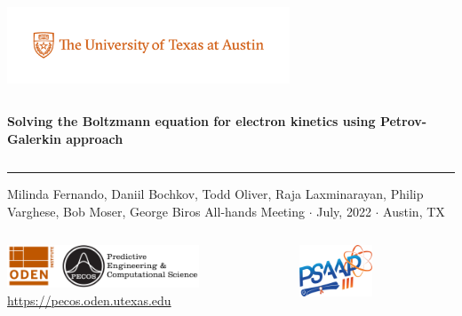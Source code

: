 \documentclass[mathserif, aspectratio=169]{beamer}
\begin{document}


%
\begin{frame}[plain,t]{}
\makeatletter
\includegraphics[height=0.9in,trim=50 40 40 0, clip]{PMSc_159_university_formal_horizontal.pdf} \newline
\begin{columns}[T,onlytextwidth]
{\bf \color{burntorange} \selectfont 
Solving the Boltzmann equation for electron kinetics using Petrov-Galerkin approach
}
\end{columns}
\vspace*{.15cm}
\rule{.8\textwidth}{0.6pt} \newline

\vspace*{0.05cm}
{\selectfont
  { \scriptsize
    Milinda Fernando, Daniil Bochkov, Todd Oliver, Raja Laxminarayan, Philip Varghese, Bob Moser, George Biros\newline
  }
  {\color{burntorange} \tiny
    All-hands Meeting $\cdot$ July, 2022 $\cdot$ Austin, TX
  }
}

\vspace*{1cm}
\begin{columns}
\begin{column}{0.8\linewidth}
\includegraphics[height=0.5in]{oden_pecos_2020_wordmark.png}\\
{\scriptsize \url{https://pecos.oden.utexas.edu}}
\end{column}

\begin{column}{0.2\linewidth}
\includegraphics[height=0.6in]{psaap3-logo.png}
\end{column}
\end{columns}

\end{frame}
\hoffset=0in
\end{document}
